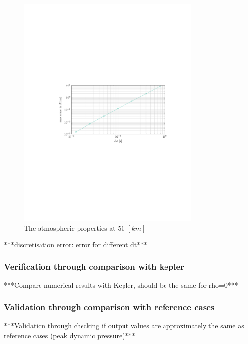 \begin{figure}[h]
	\centering
	\includegraphics[trim={4.25cm 10cm 3.2cm 10cm},clip,width=0.8\textwidth]{Figure/orbital_model/dicretization.pdf}
	\caption{The atmospheric properties at $50$ $\left[km\right]$} 
	\label{fig:atmos_disc}
\end{figure}

\label{sec:astrodisc}
***discretisation error: error for different dt***\\

\subsubsection{Verification through comparison with kepler}
\label{sec:astroverf}
***Compare numerical results with Kepler, should be the same for rho=0***\\

\subsubsection{Validation through comparison with reference cases}
\label{sec:astroval}
***Validation through checking if output values are approximately the same as reference cases (peak dynamic pressure)***\\

